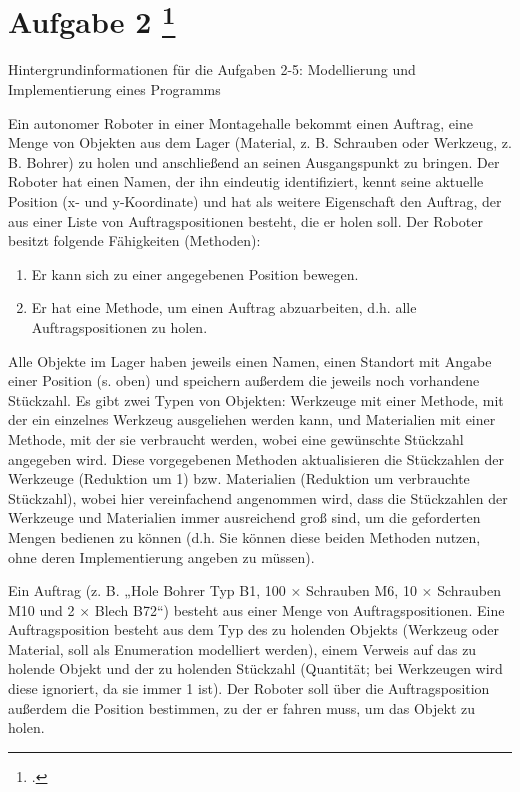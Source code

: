\documentclass{lehramt-informatik-aufgabe}
\begin{document}
\section{Aufgabe 2
\footcite{66116:2019:03}}

Hintergrundinformationen für die Aufgaben 2-5: Modellierung und
Implementierung eines Programms

Ein autonomer Roboter in einer Montagehalle bekommt einen Auftrag, eine
Menge von Objekten aus dem Lager (Material, z. B. Schrauben oder
Werkzeug, z. B. Bohrer) zu holen und anschließend an seinen
Ausgangspunkt zu bringen. Der Roboter hat einen Namen, der ihn eindeutig
identifiziert, kennt seine aktuelle Position (x- und y-Koordinate) und
hat als weitere Eigenschaft den Auftrag, der aus einer Liste von
Auftragspositionen besteht, die er holen soll. Der Roboter besitzt
folgende Fähigkeiten (Methoden):

\begin{enumerate}
\item Er kann sich zu einer angegebenen Position bewegen.

\item Er hat eine Methode, um einen Auftrag abzuarbeiten, d.h. alle
Auftragspositionen zu holen.
\end{enumerate}

Alle Objekte im Lager haben jeweils einen Namen, einen Standort mit
Angabe einer Position (s. oben) und speichern außerdem die jeweils noch
vorhandene Stückzahl. Es gibt zwei Typen von Objekten: Werkzeuge mit
einer Methode, mit der ein einzelnes Werkzeug ausgeliehen werden kann,
und Materialien mit einer Methode, mit der sie verbraucht werden, wobei
eine gewünschte Stückzahl angegeben wird. Diese vorgegebenen Methoden
aktualisieren die Stückzahlen der Werkzeuge (Reduktion um 1) bzw.
Materialien (Reduktion um verbrauchte Stückzahl), wobei hier
vereinfachend angenommen wird, dass die Stückzahlen der Werkzeuge und
Materialien immer ausreichend groß sind, um die geforderten Mengen
bedienen zu können (d.h. Sie können diese beiden Methoden nutzen, ohne
deren Implementierung angeben zu müssen).

Ein Auftrag (z. B. „Hole Bohrer Typ B1, 100 $\times$ Schrauben M6, 10
$\times$ Schrauben M10 und 2 $\times$ Blech B72“) besteht aus einer
Menge von Auftragspositionen. Eine Auftragsposition besteht aus dem Typ
des zu holenden Objekts (Werkzeug oder Material, soll als Enumeration
modelliert werden), einem Verweis auf das zu holende Objekt und der zu
holenden Stückzahl (Quantität; bei Werkzeugen wird diese ignoriert, da
sie immer 1 ist). Der Roboter soll über die Auftragsposition außerdem
die Position bestimmen, zu der er fahren muss, um das Objekt zu holen.
\end{document}
